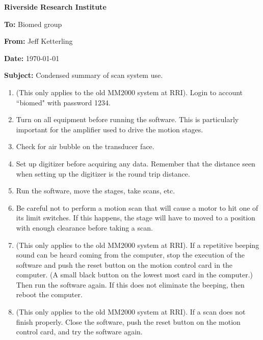 \documentclass[10pt]{article}
\begin{document}
\begin{center}
 {\huge \bf Riverside Research Institute}
\end{center}

{\bf To:} Biomed group

{\bf From:} Jeff Ketterling

{\bf Date:} \today

{\bf Subject:} Condensed summary of scan system use.
\\


\begin{enumerate}
\item (This only applies to the old MM2000 system at RRI).
Login to account ``biomed" with password 1234.

\item Turn on all equipment before running the software. This is
particularly important for the amplifier used to drive the motion
stages.

\item Check for air bubble on the transducer face.

\item Set up digitizer before acquiring any data. Remember that the
distance seen when setting up the digitizer is the round trip
distance.

\item Run the software, move the stages, take scans, etc.

\item Be careful not to perform a motion scan that will cause a motor to
hit one of its limit switches. If this happens, the stage will
have to moved to a position with enough clearance before taking a
scan.

\item (This only applies to the old MM2000 system at RRI). If a
repetitive beeping sound can be heard coming from the computer,
stop the execution of the software and push the reset button on
the motion control card in the computer. (A small black button on
the lowest most card in the computer.) Then run the software
again. If this does not eliminate the beeping, then reboot the
computer.

\item (This only applies to the old MM2000 system at RRI). If a scan
does not finish properly. Close the software, push the reset
button on the motion control card, and try the software again.

\end{enumerate}
\end{document}
